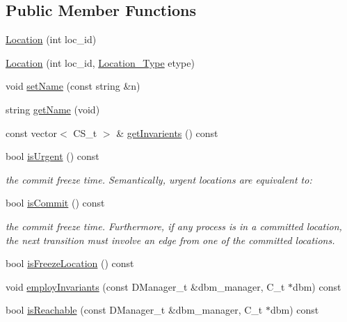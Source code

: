\subsection*{Public Member Functions}
\begin{DoxyCompactItemize}
\item 
\mbox{\hyperlink{classgraphsat_1_1_location_ac72074c9f67bbeed9762bd23f38112b1}{Location}} (int loc\+\_\+id)
\item 
\mbox{\hyperlink{classgraphsat_1_1_location_a54af3c3776b46f3fa786356b5d626507}{Location}} (int loc\+\_\+id, \mbox{\hyperlink{namespacegraphsat_a2ea948010388eb8178aa254a3b2023c9}{Location\+\_\+\+Type}} etype)
\item 
void \mbox{\hyperlink{classgraphsat_1_1_location_ae79bd21b6d5b5ff802c0d29d7d6e09db}{set\+Name}} (const string \&n)
\item 
string \mbox{\hyperlink{classgraphsat_1_1_location_a87ad30703a6e50c0f73320251eeb95a3}{get\+Name}} (void)
\item 
const vector$<$ C\+S\+\_\+t $>$ \& \mbox{\hyperlink{classgraphsat_1_1_location_ae95156bd9f528f92865ef8c51b9a6637}{get\+Invarients}} () const
\item 
bool \mbox{\hyperlink{classgraphsat_1_1_location_a446eebc27230db6d46e952d912d8a9c1}{is\+Urgent}} () const
\begin{DoxyCompactList}\small\item\em the commit freeze time. Semantically, urgent locations are equivalent to\+: \end{DoxyCompactList}\item 
bool \mbox{\hyperlink{classgraphsat_1_1_location_a052448735e1bad0bfb82db672a09b3a8}{is\+Commit}} () const
\begin{DoxyCompactList}\small\item\em the commit freeze time. Furthermore, if any process is in a committed location, the next transition must involve an edge from one of the committed locations. \end{DoxyCompactList}\item 
bool \mbox{\hyperlink{classgraphsat_1_1_location_a061c74b681729ae1fbb38802e394eef6}{is\+Freeze\+Location}} () const
\item 
void \mbox{\hyperlink{classgraphsat_1_1_location_ab4e8969e19d19b13c5fd77a6eb84e0df}{employ\+Invariants}} (const D\+Manager\+\_\+t \&dbm\+\_\+manager, C\+\_\+t $\ast$dbm) const
\item 
bool \mbox{\hyperlink{classgraphsat_1_1_location_a5cb2c4a3420724f44a1c942d2d6ca213}{is\+Reachable}} (const D\+Manager\+\_\+t \&dbm\+\_\+manager, C\+\_\+t $\ast$dbm) const

\end{DoxyCompactItemize}
